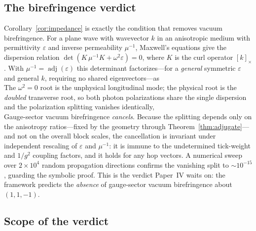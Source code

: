 \subsection{The birefringence verdict}
\label{subsec:birefringence}

Corollary~\ref{cor:impedance} is exactly the condition that removes vacuum
birefringence. For a plane wave with wavevector $k$ in an anisotropic medium with
permittivity $\varepsilon$ and inverse permeability $\mu^{-1}$, Maxwell's
equations give the dispersion relation $\det(K\,\mu^{-1}K+\omega^2\varepsilon)=0$,
where $K$ is the curl operator $[k]_\times$. With $\mu^{-1}=\operatorname{adj}
(\varepsilon)$ this determinant factorizes---for a \emph{general} symmetric
$\varepsilon$ and general $k$, requiring no shared eigenvectors---as
%
\begin{equation}
    \label{eq:dispersion}
    
\end{equation}
%
The $\omega^2=0$ root is the unphysical longitudinal mode; the physical root is
the \emph{doubled} transverse root, so both photon polarizations share the single
dispersion
%
\begin{equation}
    \label{eq:shared_dispersion}
    
\end{equation}
%
and the polarization splitting vanishes identically,
%
\begin{equation}
    \label{eq:split}
    
\end{equation}
%
Gauge-sector vacuum birefringence \emph{cancels}. Because the splitting depends
only on the anisotropy ratios---fixed by the geometry through
Theorem~\ref{thm:adjugate}---and not on the overall block scales, the cancellation
is invariant under independent rescaling of $\varepsilon$ and $\mu^{-1}$: it is
immune to the undetermined tick-weight and $1/g^2$ coupling factors, and it holds
for any hop vectors. A numerical sweep over $2\times10^4$ random propagation
directions confirms the vanishing split to $\sim10^{-15}$, guarding the symbolic
proof. This is the verdict Paper~IV waits on: the framework predicts the
\emph{absence} of gauge-sector vacuum birefringence about $(1,1,-1)$.

\subsection{Scope of the verdict}
\label{subsec:scope_verdict}


